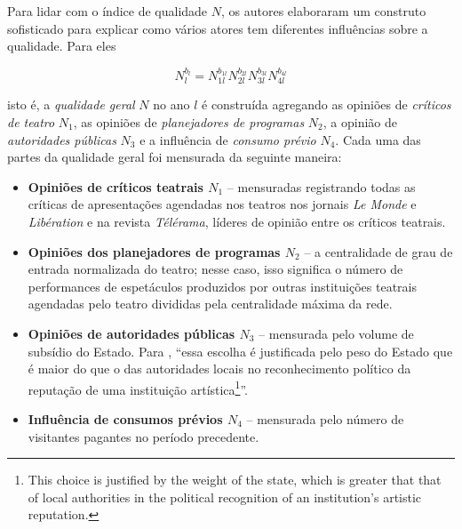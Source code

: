 \documentclass[a4paper, 12pt, openright, oneside, german, french, english, brazil]{abntex2}
\begin{document}
	Para lidar com o índice de qualidade $N$, os autores elaboraram um construto sofisticado para explicar como vários atores tem diferentes influências sobre a qualidade. Para eles
	
	\begin{equation}
	\label{biencourt-quality}
	N_{l}^{b_l} = N_{1l}^{b_{1l}} N_{2l}^{b_{2l}} N_{3l}^{b_{3l}} N_{4l}^{b_{4l}} 
	\end{equation}
	
	
	isto é, a \textit{qualidade geral} $N$ no ano $l$ é construída agregando as opiniões de \textit{críticos de teatro} $N_1$, as opiniões de \textit{planejadores de programas} $N_2$, a opinião de \textit{autoridades públicas} $N_3$ e a influência de \textit{consumo prévio} $N_4$. Cada uma das partes da qualidade geral foi mensurada da seguinte maneira:
	

	
	\begin{itemize}
		\item \textbf{Opiniões de críticos teatrais $N_1$} -- mensuradas registrando todas as críticas de apresentações agendadas nos teatros nos jornais \textit{Le Monde} e \textit{Libération} e na revista \textit{Télérama}, líderes de opinião entre os críticos teatrais.

		\item \textbf{Opiniões dos planejadores de programas $N_2$} -- a centralidade de grau de entrada normalizada do teatro; nesse caso, isso significa o número de performances de espetáculos produzidos por outras instituições teatrais agendadas pelo teatro divididas pela centralidade máxima da rede.
		
		\item \textbf{Opiniões de autoridades públicas $N_3$} -- mensurada pelo volume de subsídio do Estado. Para , ``essa escolha é justificada pelo peso do Estado que é maior do que o das autoridades locais no reconhecimento político da reputação de uma instituição artística\footnote{This choice is justified by the weight of the state, which is greater that that of local authorities in the political recognition of an institution's artistic reputation.}''.

		\item \textbf{Influência de consumos prévios $N_4$} -- mensurada pelo número de visitantes pagantes no período precedente.
	\end{itemize}
	
\end{document}
